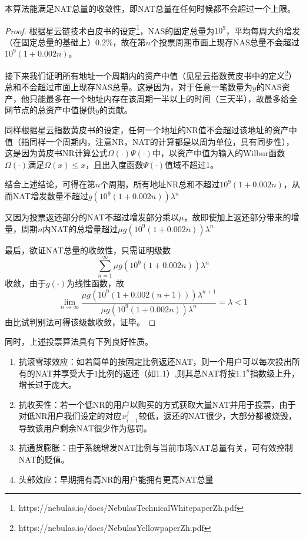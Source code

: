 \begin{property}
本算法能满足NAT总量的收敛性，即NAT总量在任何时候都不会超过一个上限。
\end{property}
\begin{proof}
	根据星云链技术白皮书的设定\footnote{https://nebulas.io/docs/NebulasTechnicalWhitepaperZh.pdf}，NAS的固定总量为$10^9$，平均每周大约增发（在固定总量的基础上）$0.2\%$，故在第$n$个投票周期市面上现存NAS总量不会超过$10^9(1+0.002n)$。
	
	接下来我们证明所有地址一个周期内的资产中值（见星云指数黄皮书中的定义\footnote{https://nebulas.io/docs/NebulasYellowpaperZh.pdf}）总和不会超过市面上现存NAS总量。这是因为，对于任意一笔数量为$y$的NAS资产，他只能最多在一个地址内存在该周期一半以上的时间（三天半），故最多给全网节点的总资产中值提供$y$的贡献。
	
	同样根据星云指数黄皮书的设定，任何一个地址的NR值不会超过该地址的资产中值（指同样一个周期内，注意NR，NAT的计算都是以周为单位，具有同步性），这是因为黄皮书NR计算公式$\Omega(\cdot)\Psi(\cdot)$中，以资产中值为输入的Wilbur函数$\Omega(\cdot)$满足$\Omega(x)\leq x$，且出入度函数$\Psi(\cdot)$值域不超过1。
	
	结合上述结论，可得在第$n$个周期，所有地址NR总和不超过$10^9(1+0.002n)$，从而NAT增发数量不超过$g(10^9(1+0.002n))\lambda^n$
	
	又因为投票返还部分的NAT不超过增发部分乘以$\mu$，故即使加上返还部分带来的增量，周期$n$内NAT的总增量超过$\mu g(10^9(1+0.002n))\lambda^n$
	
	最后，欲证NAT总量的收敛性，只需证明级数
	$$\sum_{n=1}^{\infty} \mu g(10^9(1+0.002n))\lambda^n$$
	收敛，由于$g(\cdot)$为线性函数，故
	$$ \lim_{n\rightarrow \infty} \frac{\mu g(10^9(1+0.002(n+1)))\lambda^{n+1}}{\mu g(10^9(1+0.002n))\lambda^n} = \lambda <1$$
	由比试判别法可得该级数收敛，证毕。
\end{proof}
同时，上述投票算法具有下列良好性质。
\begin{enumerate}
	\item 抗滚雪球效应：如若简单的按固定比例返还NAT，则一个用户可以每次投出所有的NAT并享受大于1比例的返还（如1.1）,则其总NAT将按$1.1^n$指数级上升，增长过于庞大。
	\item 抗收买性：若一个低NR的用户以购买的方式获取大量NAT并用于投票，由于对低NR用户我们设定的对应$x_{i-1}^j$较低，返还的NAT很少，大部分都被烧毁，导致该用户剩余NAT很少作为惩罚。
	\item 抗通货膨胀：由于系统增发NAT比例与当前市场NAT总量有关，可有效控制NAT的贬值。
	\item 头部效应：早期拥有高NR的用户能拥有更高NAT总量
\end{enumerate}